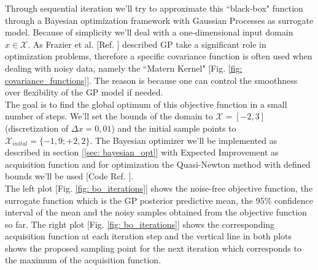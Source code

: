 \documentclass[12pt, a4paper]{article}
\begin{document}
Through sequential iteration we'll try to approximate this ``black-box" function through a Bayesian optimization framework with Gaussian Processes as surrogate model. Because of simplicity we'll deal with a one-dimensional input domain $x \in \mathcal{X}$.
As Frazier et al. [Ref. \cite{Frazier2018}] described GP take a significant role in optimization problems, therefore a specific covariance function is often used when dealing with noisy data, namely the ``Matern Kernel" [Fig. \ref{fig: covariance_functions}]. The reason is because one can control the smoothness over flexibility of the GP model if needed. \\
The goal is to find the global optimum of this objective function in a small number of steps. We'll set the bounds of the domain to $\mathcal{X} = [-2, 3]$ (discretization of $\Delta x = 0{,}01$) and the initial sample points to $\mathcal{X}_{inital} = \{-1{,}9;+2{,}2\}$.
The Bayesian optimizer we'll be implemented as described in section [\ref{sec: bayesian_opt}] with Expected Improvement as acquisition function and for optimization the Quasi-Newton method with defined bounds we'll be used [Code Ref. \cite{Gschaider}]. \\
The left plot [Fig. \ref{fig: bo_iterations}] shows the noise-free objective function, the surrogate function which is the GP posterior predictive mean, the 95\% confidence interval of the mean and the noisy samples obtained from the objective function so far. The right plot [Fig. \ref{fig: bo_iterations}] shows the corresponding acquisition function at each iteration step and the vertical line in both plots shows the proposed sampling point for the next iteration which corresponds to the maximum of the acquisition function.
\end{document}
